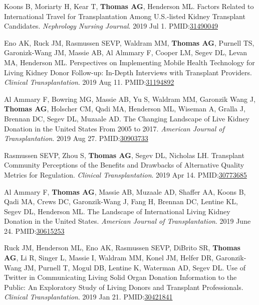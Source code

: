 \documentclass[10pt]{article}
\makeatletter
\newlength{\bibhang}
\newlength{\bibsep}
 {\@listi \global\bibsep\itemsep \global\advance\bibsep by\parsep}
\newenvironment{bibenum*}
  {\renewcommand\labelenumi{[\theenumi]}%
   \etaremune[
     topsep=0pt,
     itemsep=\bibsep,
     parsep=0pt,partopsep=0pt,
     itemindent=-\bibhang,
     leftmargin={\bibhang+\widthof{[999]}}]}
  {\endetaremune}
\newcommand{\pmid}[1]{PMID:\href{https://www.ncbi.nlm.nih.gov/pubmed/#1}{#1}}
\makeatother
\begin{document}
\begin{bibenum*}
\item Koons B, Moriarty H, Kear T, \textbf{Thomas AG}, Henderson ML.
  Factors Related to International Travel for Transplantation Among U.S.-listed
  Kidney Transplant Candidates.
  \emph{Nephrology Nursing Journal}. 2019 Jul 1.
  \pmid{31490049} %

\item Eno AK, Ruck JM, Rasmussen SEVP, Waldram MM, \textbf{Thomas AG},
  Purnell TS, Garonizk-Wang JM, Massie AB, Al Almmary F, Cooper LM,
  Segev DL, Levan MA, Henderson ML.
  Perspectives on Implementing Mobile Health Technology for Living Kidney
  Donor Follow-up: In-Depth Interviews with Transplant Providers.
  \emph{Clinical Transplantation}. 2019 Aug 11.
  \pmid{31194892} 

\item Al Ammary F, Bowring MG, Massie AB, Yu S, Waldram MM, Garonzik Wang J,
  \textbf{Thomas AG}, Holscher CM, Qadi MA, Henderson ML, Wiseman A,
  Gralla J, Brennan DC, Segev DL, Muzaale AD.
  The Changing Landscape of Live Kidney Donation in the United States
  From 2005 to 2017.
  \emph{American Journal of Transplantation}. 2019 Aug 27.
  \pmid{30903733} 

\item Rasmussen SEVP, Zhou S, \textbf{Thomas AG},
  Segev DL, Nicholas LH.
  Transplant Community Perceptions of the Benefits and Drawbacks of
  Alternative Quality Metrics for Regulation.
  \emph{Clinical Transplantation}. 2019 Apr 14.
  \pmid{30773685} 

\item Al Ammary F\dag, \textbf{Thomas AG\dag}, Massie AB, Muzaale AD,
  Shaffer AA, Koons B, Qadi MA, Crews DC, Garonzik-Wang J,
  Fang H, Brennan DC, Lentine KL, Segev DL, Henderson ML.
  The Landscape of International Living Kidney Donation in the United States.
  \emph{American Journal of Transplantation}. 2019 June 24.
  \pmid{30615253} 

\item Ruck JM\dag, Henderson ML\dag, Eno AK, Rasmussen SEVP,
  DiBrito SR, \textbf{Thomas AG}, Li R, Singer L, Massie I, Waldram MM,
  Konel JM, Helfer DR, Garonzik-Wang JM, Purnell T,
  Mogul DB, Lentine K, Waterman AD, Segev DL.
  Use of Twitter in Communicating Living Solid Organ Donation Information
  to the Public: An Exploratory Study of Living Donors and
  Transplant Professionals.
  \emph{Clinical Transplantation}. 2019 Jan 21.
  \pmid{30421841} 


\end{bibenum*}
\end{document}
